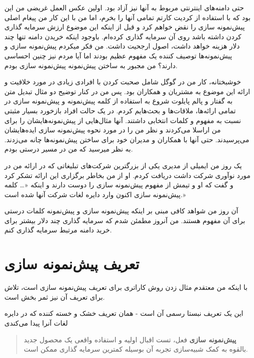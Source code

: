 حتی دامنه‌های اینترنتی مربوط به آنها نیز آزاد بود. اولین عکس العمل غریضی
من این بود که با استفاده از کردیت کارتم تمامی آنها را بخرم، اما من با
این کار من پیغام اصلی پیش‌نمونه سازی را نقض خواهم کرد و قبل از اینکه این
موضوع ارزش سرمایه گذاری کردن داشته باشد روی آن سرمایه گذاری کرده‌ام.
باوجود اینکه خریدن دامنه تنها چند دلار هزینه خواهد داشت، اصول ارجحیت
داشت. من فکر میکردم پیش‌نمونه سازی و پیش‌نمونه‌ها توصیف کننده یک مفهوم
عظیم بودند اما آیا مردم نیز چنین احساسی دارند؟ من مجبور به ساختن
پیش‌نمونه پیش‌نمونه سازی بودم.

خوشبختانه، کار من در گوگل شامل صحبت کردن با افرادی زیادی در مورد خلاقیت
و ارائه این موضوع به مشتریان و همکاران بود. پس من در کنار توضیح دو مثال
تبدیل متن به گفتار و پالم پایلوت شروع به استفاده از کلمه پیش‌نمونه و
پیش‌نمونه سازی در تمامی ارائه‌ها، ملاقات‌ها و بحث‌هایم کردم. در یک حالت
افراد بازخورد بسیار مثبتی نسبت به مفهوم و کلمات انتخابی داشتند. آنها
مثال‌هایی از پیش‌نمونه‌هایشان را برای من اراسلا می‌کردند و نظر من را در
مورد نحوه پیش‌نمونه سازی ایده‌هایشان می‌پرسیدند. حتی آنها با همکاران و
مدیران خود برای ساختن پیش‌نمونه‌ها چانه می‌زدند. به نظر میرسید که من در
مسیر درستی بودم.

یک روز من ایمیلی از مدیری یکی از بزرگترین شرکت‌های تبلیغاتی که در ارائه
من در مورد نوآوری شرکت داشت دریافت کردم. او از من بخاطر برگزاری این
ارائه تشکر کرد و گفت که او و تیمش از مفهوم پیش‌نمونه سازی را دوست دارند
و اینکه «\ldots{} کلمه پیش‌نمونه سازی اکنون وارد دایره لغات شرکت آنها
شده است.»

آن روز من شواهد کافی مبنی بر اینکه پیش‌نمونه سازی و پیش‌نمونه کلمات
درستی برای آن مفهوم هستند. من آنروز مطمئن شدم که سرمایه گذاری چند دلار
بیشتر برای خرید دامنه مرتبط سرمایه گذاری کنم.

\section{تعریف پیش‌نمونه
سازی}\label{ux62aux639ux631ux6ccux641-ux67eux6ccux634ux646ux645ux648ux646ux647-ux633ux627ux632ux6cc}

با اینکه من معتقدم مثال زدن روش‌ کاراتری برای تعریف پیش‌نمونه سازی است،
تلاش برای تعریف آن نیز ثمر بخش است.

این یک تعریف نبستا رسمی آن است - همان تعریف خشک و خسته کننده که در دایره
لغات آنرا پیدا می‌کندی

\begin{quote}
\textbf{پیش‌نمونه سازی} فعل، تست اقبال اولیه و استفاده واقعی یک محصول
جدید بالقوه به کمک شبیه‌سازی تجربه آن بوسیله کمترین سرمایه گذاری ممکن
است.
\end{quote}

